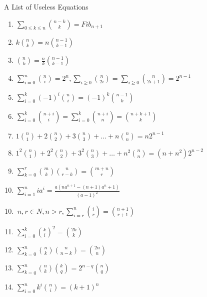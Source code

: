 \begin{Large}
	\begin{center}
		A List of Useless Equations
	\end{center}
	
	\begin{minipage}{0.5\textwidth}
		\begin{flushleft}
			\begin{enumerate}
				\item $\sum \limits_{0\leq k \leq n} {n-k \choose k} = Fib_{n+1}$
				\item $k{n \choose k}=n{n-1 \choose k-1}$
				\item ${n \choose k}=\frac{n}{k}{n-1 \choose k-1}$
				\item $\sum \limits_{i=0}^n{n \choose i}=2^n, \sum \limits_{i\geq 0}{n \choose 2i}=\sum \limits_{i\geq 0}{n \choose 2i+1}=2^{n-1}$
				\item $\sum \limits_{i= 0}^k \left( -1 \right) ^i{n \choose i}=\left( -1 \right) ^k{n-1 \choose k}$
				\item $\sum \limits_{i= 0}^k{n+i \choose i}= \sum \limits_{i= 0}^k{n+i \choose n} = {n+k+1 \choose k}$
				\item $1{n \choose 1}+2{n \choose 2}+3{n \choose 3}+…+n{n \choose n}=n2^{n-1}$
				\item $1^2{n \choose 1}+2^2{n \choose 2}+3^2{n \choose 3}+…+n^2{n \choose n}=(n+n^2)2^{n-2}$
				\item $\sum \limits_{k=0}^r{m \choose k}{n \choose r-k}={m+n \choose r}$
				\item $\sum_{i = 1}^n{ia^i} = \frac{a(n a^{n + 1} - (n + 1) a^n + 1)}{(a - 1)^2}$
			\end{enumerate}
		\end{flushleft}
	\end{minipage}
	\begin{minipage}{0.5\textwidth}
		\begin{flushleft}
			\begin{enumerate}
				\setcounter{enumi}{9}
				\item $\ n,r \in N, n > r, \sum \limits_{i=r}^n{i \choose r}={n+1 \choose r+1}$
				\item $\sum \limits_{i=0}^k{k \choose i}^2={2k \choose k}$
				\item $\sum \limits_{k=0}^n{n \choose k}{n \choose n-k}={2n \choose n}$
				\item $\sum \limits_{k=q}^n{n \choose k}{k \choose q}=2^{n-q}{n \choose q}$
				\item $\sum \limits_{i=0}^nk^i{n \choose i}=(k+1)^n$

\end{enumerate}
\end{flushleft}
\end{minipage}
\end{Large}
